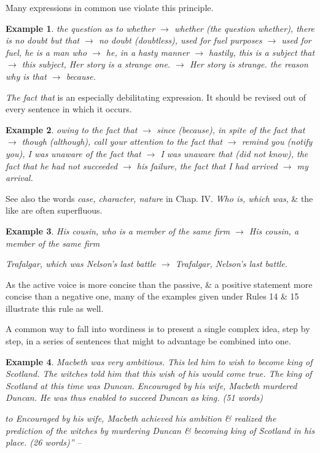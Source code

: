 \documentclass{article}
\numberwithin{equation}{section}
\newtheorem{example}{Example}[section]
\begin{document}
Many expressions in common use violate this principle.
\begin{example}
	the question as to whether $\to$ whether (the question whether), there is no doubt but that $\to$ no doubt (doubtless), used for fuel purposes $\to$ used for fuel, he is a man who $\to$ he, in a hasty manner $\to$ hastily, this is a subject that $\to$ this subject, Her story is a strange one. $\to$ Her story is strange. the reason why is that $\to$ because.
\end{example}
\textit{The fact that} is an especially debilitating expression. It should be revised out of every sentence in which it occurs.
\begin{example}
	owing to the fact that $\to$ since (because), in spite of the fact that $\to$ though (although), call your attention to the fact that $\to$ remind you (notify you), I was unaware of the fact that $\to$ I was unaware that (did not know), the fact that he had not succeeded $\to$ his failure, the fact that I had arrived $\to$ my arrival.
\end{example}
See also the words \textit{case, character, nature} in Chap. IV. \textit{Who is, which was}, \&  the like are often superfluous.
\begin{example}
	His cousin, who is a member of the same firm $\to$ His cousin, a member of the same firm
	
	Trafalgar, which was Nelson's last battle $\to$ Trafalgar, Nelson’s last battle.
\end{example}
As the active voice is more concise than the passive, \&  a positive statement more concise than a negative one, many of the examples given under Rules 14 \&  15 illustrate this rule as well.

A common way to fall into wordiness is to present a single complex idea, step by step, in a series of sentences that might to advantage be combined into one.
\begin{example}
	Macbeth was very ambitious. This led him to wish to become king of Scotland. The witches told him that this wish of his would come true. The king of Scotland at this time was Duncan. Encouraged by his wife, Macbeth murdered Duncan. He was thus enabled to succeed Duncan as king. (51 words)
	
	$to$ Encouraged by his wife, Macbeth achieved his ambition \&  realized the prediction of the witches by murdering Duncan \&  becoming king of Scotland in his place. (26 words)'' -- \cite[pp. 37--38]{Strunk_White2019}
\end{example}
\end{document}
